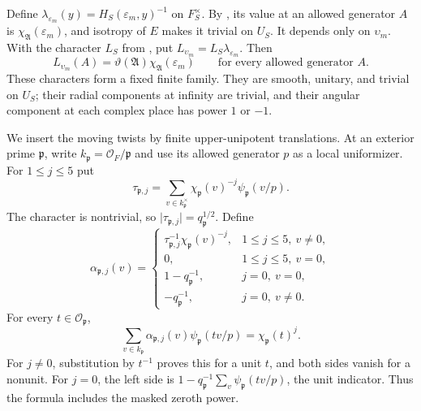 Define
\(\lambda_{\varepsilon_m}(y)=H_S(\varepsilon_m,y)^{-1}\) on \(F_S^\times\).
By , its value at an allowed generator \(A\) is
\(\chi_{\mathfrak A}(\varepsilon_m)\), and isotropy of \(E\) makes it
trivial on \(U_S\).  It depends only on \(\upsilon_m\).  With the character
\(L_S\) from , put
\(L_{\upsilon_m}=L_S\lambda_{\varepsilon_m}\).  Then
\begin{equation}\label{eq:reflection-S-character}
 L_{\upsilon_m}(A)
   =\vartheta(\mathfrak A)\chi_{\mathfrak A}(\varepsilon_m)
 \qquad\text{for every allowed generator }A.
\end{equation}
These characters form a fixed finite family.  They are smooth, unitary,
and trivial on \(U_S\); their radial components at infinity are trivial,
and their angular component at each complex place has power \(1\) or \(-1\).

We insert the moving twists by finite upper-unipotent translations.  At an
exterior prime \(\mathfrak p\), write
\(k_{\mathfrak p}=\mathcal O_F/\mathfrak p\) and use its allowed generator
\(p\) as a local uniformizer.  For \(1\le j\le5\) put
\[
 \tau_{\mathfrak p,j}
 =\sum_{v\in k_{\mathfrak p}^{\times}}
       \chi_{\mathfrak p}(v)^{-j}\psi_{\mathfrak p}(v/p).
\]
The character is nontrivial, so
\(\lvert\tau_{\mathfrak p,j}\rvert=q_{\mathfrak p}^{1/2}\).  Define
\begin{equation}\label{eq:reflection-Fourier-mask}
 \alpha_{\mathfrak p,j}(v)=
 \begin{cases}
  \tau_{\mathfrak p,j}^{-1}\chi_{\mathfrak p}(v)^{-j},
       &1\le j\le5,\ v\ne0,\\
  0,   &1\le j\le5,\ v=0,\\
  1-q_{\mathfrak p}^{-1},&j=0,\ v=0,\\
  -q_{\mathfrak p}^{-1},&j=0,\ v\ne0.
 \end{cases}
\end{equation}
For every \(t\in\mathcal O_{\mathfrak p}\),
\begin{equation}\label{eq:reflection-mask-identity}
 \sum_{v\in k_{\mathfrak p}}\alpha_{\mathfrak p,j}(v)
                \psi_{\mathfrak p}(tv/p)
       =\chi_{\mathfrak p}(t)^j.
\end{equation}
For \(j\ne0\), substitution by \(t^{-1}\) proves this for a unit \(t\),
and both sides vanish for a nonunit.  For \(j=0\), the left side is
\(1-q_{\mathfrak p}^{-1}\sum_v\psi_{\mathfrak p}(tv/p)\), the unit indicator.
Thus the formula includes the masked zeroth power.

